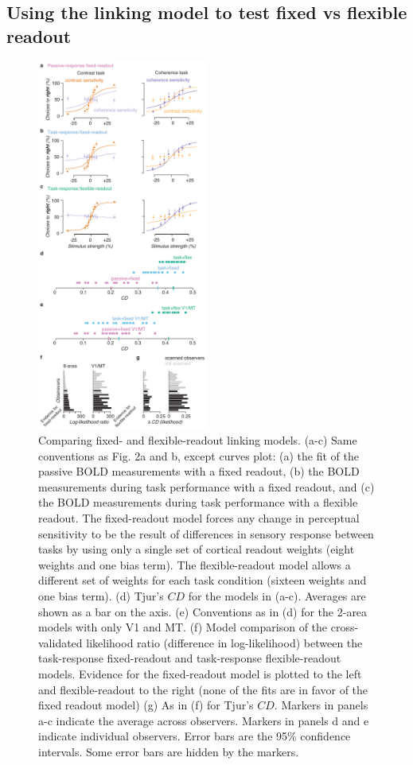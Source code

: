 \documentclass{report}
\begin{document}
\subsection{Using the linking model to test fixed vs flexible readout}

\begin{figure}
\centering
\includegraphics[keepaspectratio,width=0.5\textwidth]{figs_c2/Fig7_readout.pdf}
\caption[Comparing fixed- and flexible-readout linking models]{Comparing fixed- and flexible-readout linking models. (a-c) Same conventions as Fig. 2a and b, except curves plot: (a) the fit of the passive BOLD measurements with a fixed readout, (b) the BOLD measurements during task performance with a fixed readout, and (c) the BOLD measurements during task performance with a flexible readout. The fixed-readout model forces any change in perceptual sensitivity to be the result of differences in sensory response between tasks by using only a single set of cortical readout weights (eight weights and one bias term). The flexible-readout model allows a different set of weights for each task condition (sixteen weights and one bias term). (d) Tjur’s $CD$ for the models in (a-c). Averages are shown as a bar on the axis. (e) Conventions as in (d) for the 2-area models with only V1 and MT. (f) Model comparison of the cross-validated likelihood ratio (difference in log-likelihood) between the task-response fixed-readout and task-response flexible-readout models. Evidence for the fixed-readout model is plotted to the left and flexible-readout to the right (none of the fits are in favor of the fixed readout model) (g) As in (f) for Tjur’s $CD$. Markers in panels a-c indicate the average across observers. Markers in panels d and e indicate individual observers. Error bars are the 95\% confidence intervals. Some error bars are hidden by the markers.}
\label{fig:c4f7}
\end{figure}
\end{document}
